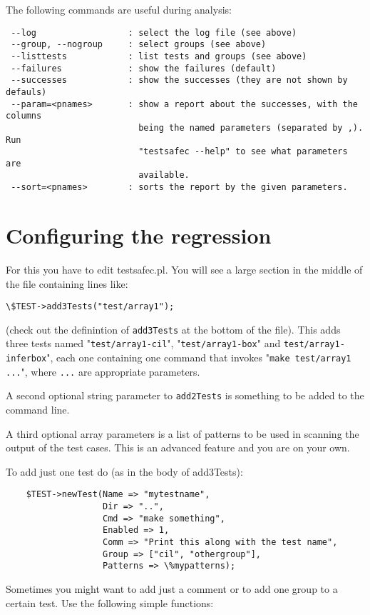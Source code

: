 \documentclass{book}
\def\t#1{{\tt #1}}
\begin{document}
 The following commands are useful during analysis:
\begin{verbatim}
 --log                  : select the log file (see above)
 --group, --nogroup     : select groups (see above)
 --listtests            : list tests and groups (see above)
 --failures             : show the failures (default)
 --successes            : show the successes (they are not shown by defauls)
 --param=<pnames>       : show a report about the successes, with the columns
                          being the named parameters (separated by ,). Run
                          "testsafec --help" to see what parameters are
                          available. 
 --sort=<pnames>        : sorts the report by the given parameters. 
\end{verbatim}

 
 \section{Configuring the regression}


 For this you have to edit testsafec.pl. You will see a large section in the
 middle of the file containing lines like:

\begin{verbatim}
\$TEST->add3Tests("test/array1");
\end{verbatim}


 (check out the definintion of \t{add3Tests} at the bottom of the file). This
 adds three tests named "\t{test/array1-cil}", "\t{test/array1-box}" and
 \t{test/array1-inferbox}", each one containing one command that invokes
 "\t{make test/array1 ...}", where \t{...} are appropriate parameters.

 A second optional string parameter to \t{add2Tests} is something to be added
 to the command line.

 A third optional array parameters is a list of patterns to be used in
scanning the output of the test cases. This is an advanced feature and you are
on your own. 


 To add just one test do (as in the body of add3Tests):

\begin{verbatim}
    $TEST->newTest(Name => "mytestname",
                   Dir => "..",
                   Cmd => "make something",
                   Enabled => 1,
                   Comm => "Print this along with the test name",
                   Group => ["cil", "othergroup"],
                   Patterns => \%mypatterns);
\end{verbatim} %
 Sometimes you might want to add just a comment or to add one group to a
 certain test. Use the following simple functions: 
\end{document}
